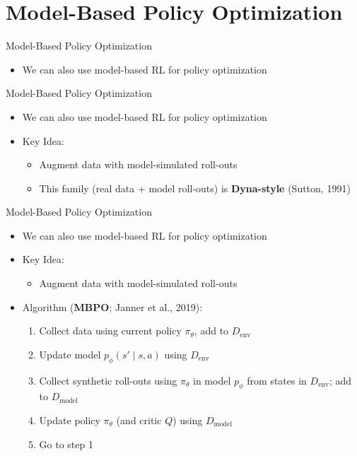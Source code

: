\section{Model-Based Policy Optimization}
\begin{frame}{Model-Based Policy Optimization}
\begin{itemize}
    \item We can also use model-based RL for policy optimization
\end{itemize}
\end{frame}

\begin{frame}{Model-Based Policy Optimization}
\begin{itemize}
    \item We can also use model-based RL for policy optimization
    \item Key Idea:
    \begin{itemize}
        \item Augment data with model-simulated roll-outs
        \item This family (real data $+$ model roll-outs) is
              \textbf{Dyna-style} (Sutton, 1991)
    \end{itemize}
\end{itemize}
\end{frame}

\begin{frame}{Model-Based Policy Optimization}
\begin{itemize}
    \item We can also use model-based RL for policy optimization
    \item Key Idea:
    \begin{itemize}
        \item Augment data with model-simulated roll-outs
    \end{itemize}
    \item Algorithm (\textbf{MBPO}; Janner et al., 2019):
    \begin{enumerate}
        \item Collect data using current policy $\pi_\theta$, add to $D_{\text{env}}$
        \item Update model $p_\phi(s' \mid s, a)$ using $D_{\text{env}}$
        \item Collect synthetic roll-outs using $\pi_\theta$ in model $p_\phi$ from states in $D_{\text{env}}$;
              add to $D_{\text{model}}$
        \item Update policy $\pi_\theta$ (and critic $Q$) using $D_{\text{model}}$
        \item Go to step 1
    \end{enumerate}
\end{itemize}
\end{frame}

